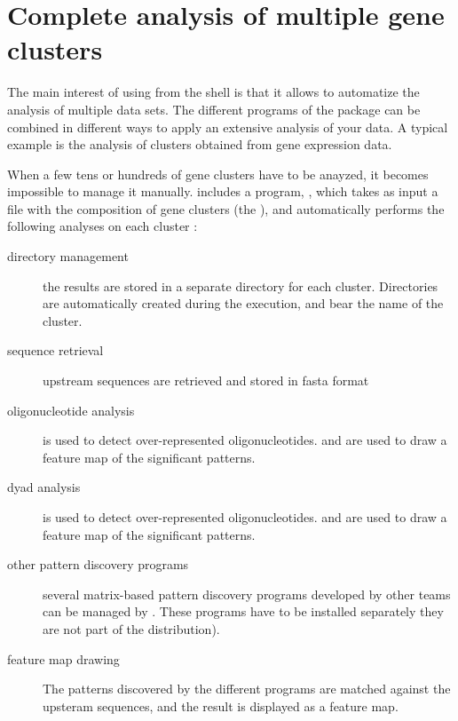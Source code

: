 \section{Complete analysis of multiple gene clusters}

The main interest of using \RSAT from the shell is that it allows to
automatize the analysis of multiple data sets. The different programs
of the package can be combined in different ways to apply an extensive
analysis of your data. A typical example is the analysis of clusters
obtained from gene expression data.

When a few tens or hundreds of gene clusters have to be anayzed, it
becomes impossible to manage it manually. \RSAT includes a program,
, which takes as input a file with
the composition of gene clusters (the ), and
automatically performs the following analyses on each cluster :

\begin{description}
\item[directory management] the results are stored in a separate
directory for each cluster. Directories are automatically created
during the execution, and bear the name of the cluster.

\item[sequence retrieval] upstream sequences are retrieved and stored
in fasta format

\item[oligonucleotide analysis]  is used to
detect over-represented oligonucleotides.  and
 are used to draw a feature map of the
significant patterns.

\item[dyad analysis]  is used to
detect over-represented oligonucleotides.  and
 are used to draw a feature map of the
significant patterns.

\item[other pattern discovery programs] several matrix-based pattern
discovery programs developed by other teams can be managed by 
. These programs have to be installed 
separately they are not part of the \RSAT distribution). 

\item[feature map drawing] The patterns discovered by the different 
programs are matched against the  upsteram sequences, and the result 
is displayed as a feature map.

\end{description}

